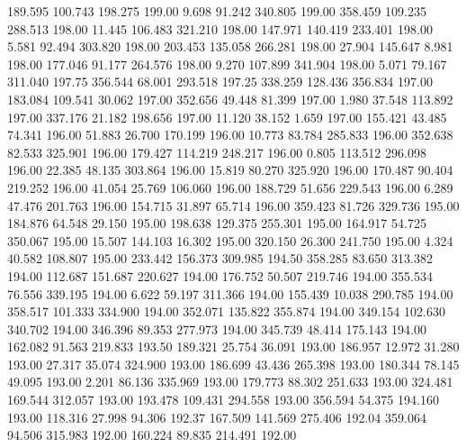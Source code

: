  189.595  100.743  198.275       199.00
   9.698   91.242  340.805       199.00
 358.459  109.235  288.513       198.00
  11.445  106.483  321.210       198.00
 147.971  140.419  233.401       198.00
   5.581   92.494  303.820       198.00
 203.453  135.058  266.281       198.00
  27.904  145.647    8.981       198.00
 177.046   91.177  264.576       198.00
   9.270  107.899  341.904       198.00
   5.071   79.167  311.040       197.75
 356.544   68.001  293.518       197.25
 338.259  128.436  356.834       197.00
 183.084  109.541   30.062       197.00
 352.656   49.448   81.399       197.00
   1.980   37.548  113.892       197.00
 337.176   21.182  198.656       197.00
  11.120   38.152    1.659       197.00
 155.421   43.485   74.341       196.00
  51.883   26.700  170.199       196.00
  10.773   83.784  285.833       196.00
 352.638   82.533  325.901       196.00
 179.427  114.219  248.217       196.00
   0.805  113.512  296.098       196.00
  22.385   48.135  303.864       196.00
  15.819   80.270  325.920       196.00
 170.487   90.404  219.252       196.00
  41.054   25.769  106.060       196.00
 188.729   51.656  229.543       196.00
   6.289   47.476  201.763       196.00
 154.715   31.897   65.714       196.00
 359.423   81.726  329.736       195.00
 184.876   64.548   29.150       195.00
 198.638  129.375  255.301       195.00
 164.917   54.725  350.067       195.00
  15.507  144.103   16.302       195.00
 320.150   26.300  241.750       195.00
   4.324   40.582  108.807       195.00
 233.442  156.373  309.985       194.50
 358.285   83.650  313.382       194.00
 112.687  151.687  220.627       194.00
 176.752   50.507  219.746       194.00
 355.534   76.556  339.195       194.00
   6.622   59.197  311.366       194.00
 155.439   10.038  290.785       194.00
 358.517  101.333  334.900       194.00
 352.071  135.822  355.874       194.00
 349.154  102.630  340.702       194.00
 346.396   89.353  277.973       194.00
 345.739   48.414  175.143       194.00
 162.082   91.563  219.833       193.50
 189.321   25.754   36.091       193.00
 186.957   12.972   31.280       193.00
  27.317   35.074  324.900       193.00
 186.699   43.436  265.398       193.00
 180.344   78.145   49.095       193.00
   2.201   86.136  335.969       193.00
 179.773   88.302  251.633       193.00
 324.481  169.544  312.057       193.00
 193.478  109.431  294.558       193.00
 356.594   54.375  194.160       193.00
 118.316   27.998   94.306       192.37
 167.509  141.569  275.406       192.04
 359.064   94.506  315.983       192.00
 160.224   89.835  214.491       192.00
